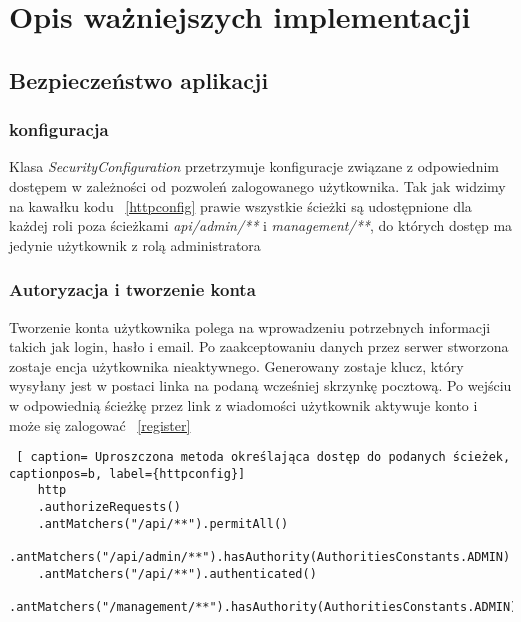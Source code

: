 \section{Opis ważniejszych  implementacji}

\subsection{Bezpieczeństwo aplikacji}
\subsubsection{konfiguracja}
Klasa \textit{SecurityConfiguration} przetrzymuje konfiguracje związane z odpowiednim dostępem w zależności od pozwoleń zalogowanego użytkownika. Tak jak widzimy na kawałku kodu ~\ref{httpconfig} prawie wszystkie ścieżki są udostępnione dla każdej roli poza ścieżkami \textit{api/admin/**} i \textit{management/**}, do których dostęp ma jedynie użytkownik z rolą administratora

\subsubsection{Autoryzacja i tworzenie konta}
Tworzenie konta użytkownika polega na wprowadzeniu potrzebnych informacji takich jak login, hasło i email. Po zaakceptowaniu danych przez serwer stworzona zostaje encja użytkownika nieaktywnego. Generowany zostaje klucz, który wysyłany jest w postaci linka na podaną wcześniej skrzynkę pocztową. Po wejściu w odpowiednią ścieżkę przez link z wiadomości użytkownik aktywuje konto i może się zalogować ~\ref{register}

\clearpage
\begin{lstlisting} [ caption= Uproszczona metoda określająca dostęp do podanych ścieżek, captionpos=b, label={httpconfig}]
	http
	.authorizeRequests()
	.antMatchers("/api/**").permitAll()
	.antMatchers("/api/admin/**").hasAuthority(AuthoritiesConstants.ADMIN)
	.antMatchers("/api/**").authenticated()
	.antMatchers("/management/**").hasAuthority(AuthoritiesConstants.ADMIN);
\end{lstlisting}


